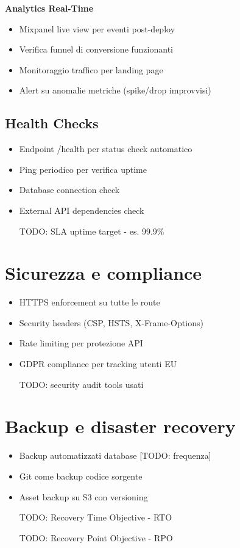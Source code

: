 \textbf{Analytics Real-Time}
\begin{itemize}
  \item Mixpanel live view per eventi post-deploy
  \item Verifica funnel di conversione funzionanti
  \item Monitoraggio traffico per landing page
  \item Alert su anomalie metriche (spike/drop improvvisi)
\end{itemize}

\subsection{Health Checks}
\begin{itemize}
  \item Endpoint /health per status check automatico
  \item Ping periodico per verifica uptime
  \item Database connection check
  \item External API dependencies check
  \item [TODO: SLA uptime target - es. 99.9\%]
\end{itemize}

\section{Sicurezza e compliance}
\begin{itemize}
  \item HTTPS enforcement su tutte le route
  \item Security headers (CSP, HSTS, X-Frame-Options)
  \item Rate limiting per protezione API
  \item GDPR compliance per tracking utenti EU
  \item [TODO: security audit tools usati]
\end{itemize}

\section{Backup e disaster recovery}
\begin{itemize}
  \item Backup automatizzati database [TODO: frequenza]
  \item Git come backup codice sorgente
  \item Asset backup su S3 con versioning
  \item [TODO: Recovery Time Objective - RTO]
  \item [TODO: Recovery Point Objective - RPO]
\end{itemize}